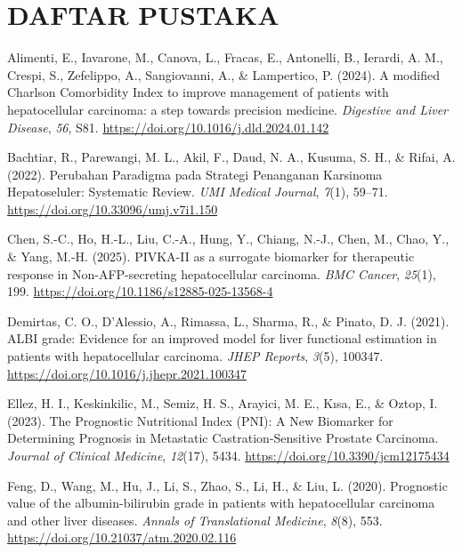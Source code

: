 \documentclass[
  indonesian,
]{report}
\newlength{\cslhangindent}
\newenvironment{CSLReferences}[2] %
 {\begin{list}{}{%
  \setlength{\itemindent}{0pt}
  \setlength{\leftmargin}{0pt}
  \setlength{\parsep}{0pt}
  \ifodd #1
   \setlength{\leftmargin}{\cslhangindent}
   \setlength{\itemindent}{-1\cslhangindent}
  \fi
  \setlength{\itemsep}{#2\baselineskip}}}
 {\end{list}}
\begin{document}
\chapter*{DAFTAR PUSTAKA}\label{daftar-pustaka}

\protect{}\label{refs}
\begin{CSLReferences}{1}{0}
Alimenti, E., Iavarone, M., Canova, L., Fracas, E., Antonelli, B.,
Ierardi, A. M., Crespi, S., Zefelippo, A., Sangiovanni, A., \&
Lampertico, P. (2024). A modified {Charlson} {Comorbidity} {Index} to
improve management of patients with hepatocellular carcinoma: a step
towards precision medicine. \emph{Digestive and Liver Disease},
\emph{56}, S81. \url{https://doi.org/10.1016/j.dld.2024.01.142}

Bachtiar, R., Parewangi, M. L., Akil, F., Daud, N. A., Kusuma, S. H., \&
Rifai, A. (2022). Perubahan {Paradigma} pada {Strategi} {Penanganan}
{Karsinoma} {Hepatoseluler}: {Systematic} {Review}. \emph{UMI Medical
Journal}, \emph{7}(1), 59--71.
\url{https://doi.org/10.33096/umj.v7i1.150}

Chen, S.-C., Ho, H.-L., Liu, C.-A., Hung, Y., Chiang, N.-J., Chen, M.,
Chao, Y., \& Yang, M.-H. (2025). {PIVKA}-{II} as a surrogate biomarker
for therapeutic response in {Non}-{AFP}-secreting hepatocellular
carcinoma. \emph{BMC Cancer}, \emph{25}(1), 199.
\url{https://doi.org/10.1186/s12885-025-13568-4}

Demirtas, C. O., D'Alessio, A., Rimassa, L., Sharma, R., \& Pinato, D.
J. (2021). {ALBI} grade: {Evidence} for an improved model for liver
functional estimation in patients with hepatocellular carcinoma.
\emph{JHEP Reports}, \emph{3}(5), 100347.
\url{https://doi.org/10.1016/j.jhepr.2021.100347}

Ellez, H. I., Keskinkilic, M., Semiz, H. S., Arayici, M. E., Kısa, E.,
\& Oztop, I. (2023). The {Prognostic} {Nutritional} {Index} ({PNI}): {A}
{New} {Biomarker} for {Determining} {Prognosis} in {Metastatic}
{Castration}-{Sensitive} {Prostate} {Carcinoma}. \emph{Journal of
Clinical Medicine}, \emph{12}(17), 5434.
\url{https://doi.org/10.3390/jcm12175434}

Feng, D., Wang, M., Hu, J., Li, S., Zhao, S., Li, H., \& Liu, L. (2020).
Prognostic value of the albumin-bilirubin grade in patients with
hepatocellular carcinoma and other liver diseases. \emph{Annals of
Translational Medicine}, \emph{8}(8), 553.
\url{https://doi.org/10.21037/atm.2020.02.116}


\end{CSLReferences}
\end{document}
